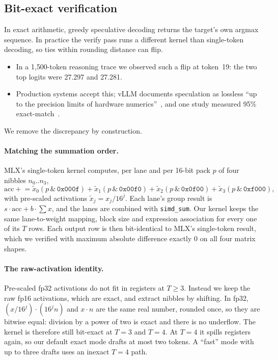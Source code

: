 \documentclass[11pt]{article}
\begin{document}
\subsection{Bit-exact verification}
\label{sec:exact}
In exact arithmetic, greedy speculative decoding returns the target's own argmax sequence. In practice the verify pass runs a different kernel than single-token decoding, so ties within rounding distance can flip.
\begin{itemize}
\item In a 1{,}500-token reasoning trace we observed such a flip at token~19: the two top logits were 27.297 and 27.281.
\item Production systems accept this; vLLM documents speculation as lossless ``up to the precision limits of hardware numerics''~\cite{vllm2026specdecode}, and one study measured 95\% exact-match~\cite{zhang2026correctness}.
\end{itemize}
We remove the discrepancy by construction.

\paragraph{Matching the summation order.} MLX's single-token kernel computes, per lane and per 16-bit pack $p$ of four nibbles $n_0..n_3$,
\[\textstyle \mathrm{acc} \mathrel{+}= \tilde x_0 (p\,\&\,\mathtt{0x000f}) + \tilde x_1 (p\,\&\,\mathtt{0x00f0}) + \tilde x_2 (p\,\&\,\mathtt{0x0f00}) + \tilde x_3 (p\,\&\,\mathtt{0xf000}),\]
with pre-scaled activations $\tilde x_j = x_j/16^j$. Each lane's group result is $s\cdot\mathrm{acc} + b\cdot\sum x$, and the lanes are combined with \texttt{simd\_sum}. Our kernel keeps the same lane-to-weight mapping, block size and expression association for every one of its $T$ rows. Each output row is then bit-identical to MLX's single-token result, which we verified with maximum absolute difference exactly 0 on all four matrix shapes.

\paragraph{The raw-activation identity.} Pre-scaled fp32 activations do not fit in registers at $T{\ge}3$. Instead we keep the raw fp16 activations, which are exact, and extract nibbles by shifting. In fp32, $(x/16^j)\cdot(16^j n)$ and $x\cdot n$ are the same real number, rounded once, so they are bitwise equal: division by a power of two is exact and there is no underflow. The kernel is therefore still bit-exact at $T{=}3$ and $T{=}4$. At $T{=}4$ it spills registers again, so our default exact mode drafts at most two tokens. A ``fast'' mode with up to three drafts uses an inexact $T{=}4$ path.
\end{document}
